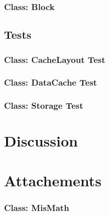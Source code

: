 \documentclass[a4paper]{scrreprt}
\begin{document}
\subsection{Class: Block}
\label{subsec:block.java}


\section{Tests}

\subsection{Class: CacheLayout Test}
\label{subsec:cachelayouttest.java}


\subsection{Class: DataCache Test}
\label{subsec:cachelayouttest.java}


\subsection{Class: Storage Test}
\label{subsec:cachelayouttest.java}


\chapter{Discussion}

\chapter{Attachements}

\subsection{Class: MisMath}
\label{subsec:mismath.java}

\end{document}
